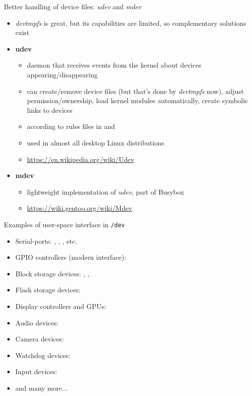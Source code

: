 \begin{frame}{Better handling of device files: {\em udev} and {\em mdev}}
  \begin{itemize}
  \item {\em devtmpfs} is great, but its capabilities are limited, so
    complementary solutions exist
  \item {\bf udev}
    \begin{itemize}
    \item daemon that receives events from the kernel about devices
      appearing/disappearing
    \item can create/remove device files (but that's done by
      {\em devtmpfs} now), adjust permission/ownership,
      load kernel modules automatically, create symbolic links to
      devices
    \item according to rules files in  and
    \item used in almost all desktop Linux distributions
    \item \url{https://en.wikipedia.org/wiki/Udev}
    \end{itemize}
  \item {\bf mdev}
    \begin{itemize}
    \item lightweight implementation of {\em udev}, part of Busybox
    \item \url{https://wiki.gentoo.org/wiki/Mdev}
    \end{itemize}
  \end{itemize}
\end{frame}

\begin{frame}{Examples of user-space interface in {\tt /dev}}
  \begin{itemize}
  \item Serial-ports: , ,
    , etc.
  \item GPIO controllers (modern interface): 
  \item Block storage devices: , , 
  \item Flash storage devices: 
  \item Display controllers and GPUs: 
  \item Audio devices: 
  \item Camera devices: 
  \item Watchdog devices: 
  \item Input devices: 
  \item and many more...
  \end{itemize}
\end{frame}

